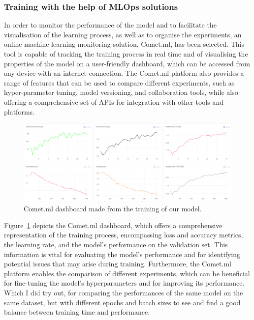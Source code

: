 \subsubsection{Training with the help of MLOps solutions}\label{subsec:training-with-the-help-of-mlops-solutions}
In order to monitor the performance of the model and to facilitate the visualisation of the learning process,
as well as to organise the experiments, an online machine learning monitoring solution, Comet.ml, has been selected.
This tool is capable of tracking the training process in real time and of visualising the properties of the model on
a user-friendly dashboard, which can be accessed from any device with an internet connection.
The Comet.ml platform also provides a range of features that can be used to compare different experiments,
such as hyper-parameter tuning, model versioning, and collaboration tools, while also offering a comprehensive
set of APIs for integration with other tools and platforms.

\begin{figure}[ht]
\centering
\includegraphics[width=1.0\textwidth]{figures/model}
\caption{Comet.ml dashboard made from the training of our model.}
\label{fig:comet}
\end{figure}

Figure~\ref{fig:comet} depicts the Comet.ml dashboard, which offers a comprehensive representation of the training process,
encompassing loss and accuracy metrics, the learning rate, and the model's performance on the validation set.
This information is vital for evaluating the model's performance and for identifying potential issues that may arise during training.
Furthermore, the Comet.ml platform enables the comparison of different experiments,
which can be beneficial for fine-tuning the model's hyperparameters and for improving its performance.
Which I did try out, for comparing the performances of the same model on the same dataset,
but with different epochs and batch sizes to see and find a good balance between training time and performance.

